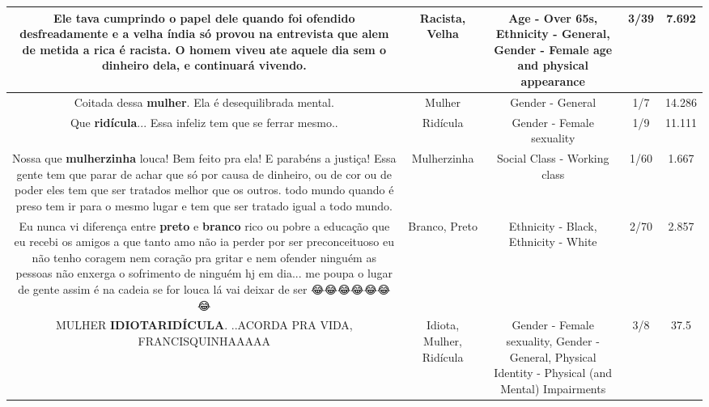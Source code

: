 \documentclass[11pt]{article}
\newlength\mylength
\begin{document}
\begin{center}
\begin{longtable}{|C{.65\mylength}|C{.30\mylength}|C{.12\mylength}|C{.12\mylength}|C{.12\mylength}|}
  \small Ele tava cumprindo o papel dele quando foi ofendido desfreadamente e a \textbf{v\textbf{elha}} índia só provou na entrevista que alem de metida a rica é \textbf{racista}. O homem viveu ate aquele dia sem o dinheiro dela, e continuará vivendo.\normalsize   & Racista, Velha & Age - Over 65s, Ethnicity - General, Gender - Female age and physical appearance & 3/39 & 7.692 \\  \hline
  \small Coitada dessa \textbf{mulher}. Ela é desequilibrada mental.\normalsize   & Mulher & Gender - General & 1/7 & 14.286 \\  \hline
  \small Que \textbf{ridícula}... Essa infeliz tem que se ferrar mesmo..\normalsize   & Ridícula & Gender - Female sexuality & 1/9 & 11.111 \\  \hline
  \small Nossa que \textbf{mulherzinha} louca! Bem feito pra ela! E parabéns a justiça! Essa gente tem que parar de achar que só por causa de dinheiro, ou de cor ou de poder eles tem que ser tratados melhor que os outros. todo mundo quando é preso tem ir para o mesmo lugar e tem que ser tratado igual a todo mundo.\normalsize   & Mulherzinha & Social Class - Working class & 1/60 & 1.667 \\  \hline
  \small Eu nunca vi diferença entre \textbf{preto} e \textbf{branco} rico ou pobre a educação que eu recebi os amigos a que tanto amo não ia perder por ser preconceituoso eu não tenho coragem nem coração pra gritar e nem ofender ninguém as pessoas não enxerga o sofrimento de ninguém hj em dia... me poupa o lugar de gente assim é na cadeia se for louca lá vai deixar de ser 😂😂😂😂😂😂😂\normalsize   & Branco, Preto & Ethnicity - Black, Ethnicity - White & 2/70 & 2.857 \\  \hline
  \small MULHER \textbf{IDIOTA}\textbf{RIDÍCULA}. ..ACORDA PRA VIDA, FRANCISQUINHAAAAA\normalsize   & Idiota, Mulher, Ridícula & Gender - Female sexuality, Gender - General, Physical Identity - Physical (and Mental) Impairments & 3/8 & 37.5 \\  \hline

\end{longtable}
\end{center}
\end{document}
